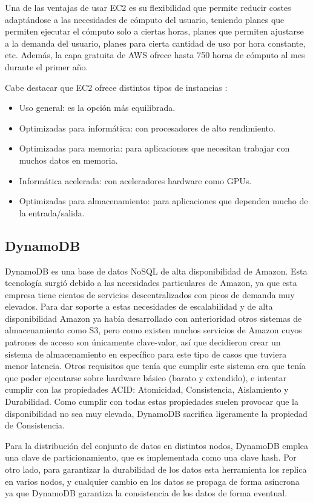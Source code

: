 Una de las ventajas de usar EC2 es su flexibilidad que permite reducir costes adaptándose a las necesidades de cómputo del usuario, teniendo planes que permiten ejecutar el cómputo solo a ciertas horas, planes que permiten ajustarse a la demanda del usuario, planes para cierta cantidad de uso por hora constante, etc. Además, la capa gratuita de AWS ofrece hasta 750 horas de cómputo al mes durante el primer año.

Cabe destacar que EC2 ofrece distintos tipos de instancias \cite{ec2_instances}:
\begin{itemize}
    \item Uso general: es la opción más equilibrada.
    \item Optimizadas para informática: con procesadores de alto rendimiento.
    \item Optimizadas para memoria: para aplicaciones que necesitan trabajar con muchos datos en memoria.
    \item Informática acelerada: con aceleradores hardware como GPUs.
    \item Optimizadas para almacenamiento: para aplicaciones que dependen mucho de la entrada/salida.
\end{itemize}

\subsection{DynamoDB}

DynamoDB es una base de datos NoSQL de alta disponibilidad de Amazon. Esta tecnología surgió debido a las necesidades particulares de Amazon, ya que esta empresa tiene cientos de servicios descentralizados con picos de demanda muy elevados. Para dar soporte a estas necesidades de escalabilidad y de alta disponibilidad Amazon ya había desarrollado con anterioridad otros sistemas de almacenamiento como S3, pero como existen muchos servicios de Amazon cuyos patrones de acceso son únicamente clave-valor, así que decidieron crear un sistema de almacenamiento en específico para este tipo de casos que tuviera menor latencia. Otros requisitos que tenía que cumplir este sistema era que tenía que poder ejecutarse sobre hardware básico (barato y extendido), e intentar cumplir con las propiedades ACID: Atomicidad, Consistencia, Aislamiento y Durabilidad. Como cumplir con todas estas propiedades suelen provocar que la disponibilidad no sea muy elevada, DynamoDB sacrifica ligeramente la propiedad de Consistencia.

Para la distribución del conjunto de datos en distintos nodos, DynamoDB emplea una clave de particionamiento, que es implementada como una clave hash. Por otro lado, para garantizar la durabilidad de los datos esta herramienta los replica en varios nodos, y cualquier cambio en los datos se propaga de forma asíncrona ya que DynamoDB garantiza la consistencia de los datos de forma eventual.

